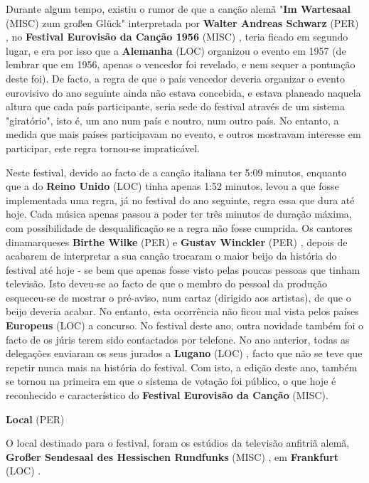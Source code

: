 \documentclass[12pt,a4paper]{article}
\begin{document}
Durante algum tempo, existiu o rumor de que a canção alemã "\textbf{Im Wartesaal} (MISC) zum großen Glück" interpretada por \textbf{Walter Andreas Schwarz} (PER) , no \textbf{Festival Eurovisão da Canção 1956} (MISC) , teria ficado em segundo lugar, e era por isso que a \textbf{Alemanha} (LOC) organizou o evento em 1957 (de lembrar que em 1956, apenas o vencedor foi revelado, e nem sequer a pontuação deste foi). De facto, a regra de que o país vencedor deveria organizar o evento eurovisivo do ano seguinte ainda não estava concebida, e estava planeado naquela altura que cada país participante, seria sede do festival através de um sistema "giratório", isto é, um ano num país e noutro, num outro país. No entanto, a medida que mais países participavam no evento, e outros mostravam interesse em participar, este regra tornou-se impraticável.

Neste festival, devido ao facto de a canção italiana ter 5:09 minutos, enquanto que a do \textbf{Reino Unido} (LOC) tinha apenas 1:52 minutos, levou a que fosse implementada uma regra, já no festival do ano seguinte, regra essa que dura até hoje. Cada música apenas passou a poder ter três minutos de duração máxima, com possibilidade de desqualificação se a regra não fosse cumprida. Os cantores dinamarqueses \textbf{Birthe Wilke} (PER) e \textbf{Gustav Winckler} (PER) , depois de acabarem de interpretar a sua canção trocaram o maior beijo da história do festival até hoje - se bem que apenas fosse visto pelas poucas pessoas que tinham televisão. Isto deveu-se ao facto de que o membro do pessoal da produção esqueceu-se de mostrar o pré-aviso, num cartaz (dirigido aos artistas), de que o beijo deveria acabar. No entanto, esta ocorrência não ficou mal vista pelos países \textbf{Europeus} (LOC) a concurso. No festival deste ano, outra novidade também foi o facto de os júris terem sido contactados por telefone. No ano anterior, todas as delegações enviaram os seus jurados a \textbf{Lugano} (LOC) , facto que não se teve que repetir nunca mais na história do festival. Com isto, a edição deste ano, também se tornou na primeira em que o sistema de votação foi público, o que hoje é reconhecido e característico do \textbf{Festival Eurovisão da Canção} (MISC).



\textbf{Local} (PER)

O local destinado para o festival, foram os estúdios da televisão anfitriã alemã, \textbf{Großer Sendesaal des Hessischen Rundfunks} (MISC) , em \textbf{Frankfurt} (LOC) .
\end{document}
